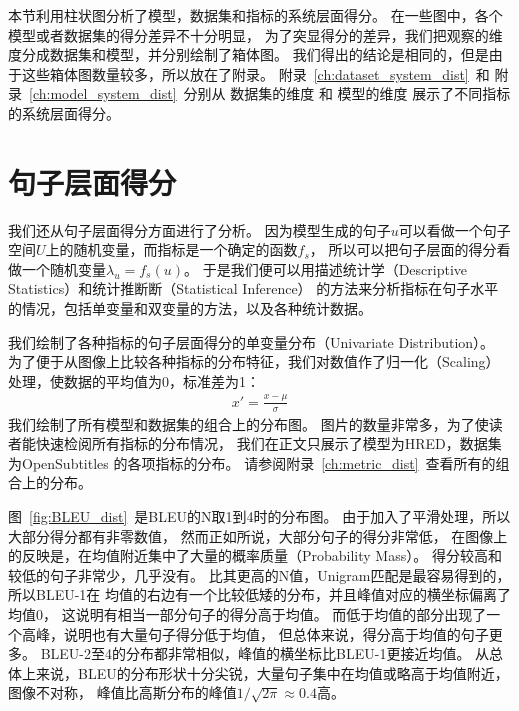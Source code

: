 本节利用柱状图分析了模型，数据集和指标的系统层面得分。
在一些图中，各个模型或者数据集的得分差异不十分明显，
为了突显得分的差异，我们把观察的维度分成数据集和模型，并分别绘制了箱体图。
我们得出的结论是相同的，但是由于这些箱体图数量较多，所以放在了附录。
附录~\ref{ch:dataset_system_dist}~和
附录~\ref{ch:model_system_dist}~分别从
数据集的维度 和 模型的维度 展示了不同指标的系统层面得分。

\section{句子层面得分}\label{sec:utterance_scores}
我们还从句子层面得分方面进行了分析。
因为模型生成的句子$u$可以看做一个句子空间$U$上的随机变量，而指标是一个确定的函数$f_{s}$，
所以可以把句子层面的得分看做一个随机变量$\lambda_u = f_{s}(u)$。
于是我们便可以用描述统计学（Descriptive Statistics）和统计推断断（Statistical Inference）
的方法来分析指标在句子水平的情况，包括单变量和双变量的方法，以及各种统计数据。

我们绘制了各种指标的句子层面得分的单变量分布（Univariate Distribution）。
为了便于从图像上比较各种指标的分布特征，我们对数值作了归一化（Scaling）处理，使数据的平均值为0，标准差为1：
\begin{align}
    x' = \frac{x - \mu}{\sigma}
\end{align}
我们绘制了所有模型和数据集的组合上的分布图。
图片的数量非常多，为了使读者能快速检阅所有指标的分布情况，
我们在正文只展示了模型为HRED，数据集为OpenSubtitles
的各项指标的分布。
请参阅附录~\ref{ch:metric_dist}~查看所有的组合上的分布。


图~\ref{fig:BLEU_dist}~是BLEU的N取1到4时的分布图。
由于加入了平滑处理，所以大部分得分都有非零数值，
然而正如\cite{HowNot}所说，大部分句子的得分非常低，
在图像上的反映是，在均值附近集中了大量的概率质量（Probability Mass）。
得分较高和较低的句子非常少，几乎没有。
比其更高的N值，Unigram匹配是最容易得到的，所以BLEU-1在
均值的右边有一个比较低矮的分布，并且峰值对应的横坐标偏离了均值0，
这说明有相当一部分句子的得分高于均值。
而低于均值的部分出现了一个高峰，说明也有大量句子得分低于均值，
但总体来说，得分高于均值的句子更多。
BLEU-2至4的分布都非常相似，峰值的横坐标比BLEU-1更接近均值。
从总体上来说，BLEU的分布形状十分尖锐，大量句子集中在均值或略高于均值附近，
图像不对称， 峰值比高斯分布的峰值$1 / \sqrt{2 \pi} \approx 0.4$高。


